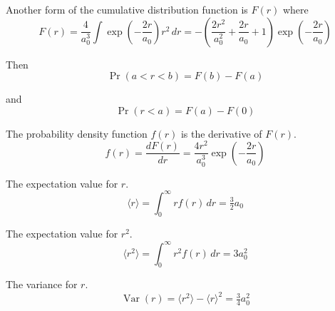 \bigskip
Another form of the cumulative distribution function is $F(r)$ where
\begin{equation*}
F(r)=\frac{4}{a_0^3}
\int\exp\left(-\frac{2r}{a_0}\right)r^2\,dr
=-\left(\frac{2r^2}{a_0^2}+\frac{2r}{a_0}+1\right)
\exp\left(-\frac{2r}{a_0}\right)
\tag{2}
\end{equation*}

Then
\begin{equation*}
\Pr(a<r<b)=F(b)-F(a)
\end{equation*}

and
\begin{equation*}
\Pr(r<a)=F(a)-F(0)
\end{equation*}

The probability density function $f(r)$ is the derivative of $F(r)$.
\begin{equation*}
f(r)=\frac{dF(r)}{dr}=\frac{4r^2}{a_0^3}\exp\left(-\frac{2r}{a_0}\right)
\tag{3}
\end{equation*}

The expectation value for $r$.
\begin{equation*}
\langle r\rangle=\int_0^\infty rf(r)\,dr=\tfrac{3}{2}a_0
\end{equation*}

The expectation value for $r^2$.
\begin{equation*}
\langle r^2\rangle=\int_0^\infty r^2f(r)\,dr=3a_0^2
\end{equation*}

The variance for $r$.
\begin{equation*}
\operatorname{Var}(r)=\langle r^2\rangle-\langle r\rangle^2=\tfrac{3}{4}a_0^2
\end{equation*}


